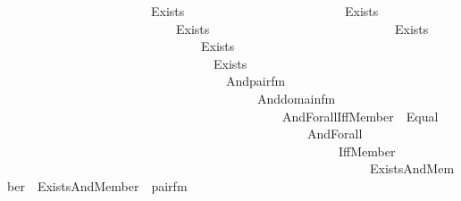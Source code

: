 \begin{isabellebody}
\ \ \ \ \ \ \ \ \ \ \ \ \ \ \ \ \ \ \ \ \ \ \ {\isacharparenleft}{\kern0pt}Exists\isanewline
\ \ \ \ \ \ \ \ \ \ \ \ \ \ \ \ \ \ \ \ \ \ \ \ \ {\isacharparenleft}{\kern0pt}Exists\isanewline
\ \ \ \ \ \ \ \ \ \ \ \ \ \ \ \ \ \ \ \ \ \ \ \ \ \ \ {\isacharparenleft}{\kern0pt}Exists\isanewline
\ \ \ \ \ \ \ \ \ \ \ \ \ \ \ \ \ \ \ \ \ \ \ \ \ \ \ \ \ {\isacharparenleft}{\kern0pt}Exists\isanewline
\ \ \ \ \ \ \ \ \ \ \ \ \ \ \ \ \ \ \ \ \ \ \ \ \ \ \ \ \ \ \ {\isacharparenleft}{\kern0pt}Exists\isanewline
\ \ \ \ \ \ \ \ \ \ \ \ \ \ \ \ \ \ \ \ \ \ \ \ \ \ \ \ \ \ \ \ \ {\isacharparenleft}{\kern0pt}Exists\isanewline
\ \ \ \ \ \ \ \ \ \ \ \ \ \ \ \ \ \ \ \ \ \ \ \ \ \ \ \ \ \ \ \ \ \ \ {\isacharparenleft}{\kern0pt}And{\isacharparenleft}{\kern0pt}pair{\isacharunderscore}{\kern0pt}fm{\isacharparenleft}{\kern0pt}{}{\isacharcomma}{\kern0pt}\ {}{\isacharcomma}{\kern0pt}\ {}{}{\isacharparenright}{\kern0pt}{\isacharcomma}{\kern0pt}\isanewline
\ \ \ \ \ \ \ \ \ \ \ \ \ \ \ \ \ \ \ \ \ \ \ \ \ \ \ \ \ \ \ \ \ \ \ \ \ \ \ \ And{\isacharparenleft}{\kern0pt}domain{\isacharunderscore}{\kern0pt}fm{\isacharparenleft}{\kern0pt}{}{\isacharcomma}{\kern0pt}\ {}{\isacharparenright}{\kern0pt}{\isacharcomma}{\kern0pt}\isanewline
\ \ \ \ \ \ \ \ \ \ \ \ \ \ \ \ \ \ \ \ \ \ \ \ \ \ \ \ \ \ \ \ \ \ \ \ \ \ \ \ \ \ \ \ And{\isacharparenleft}{\kern0pt}Forall{\isacharparenleft}{\kern0pt}Iff{\isacharparenleft}{\kern0pt}Member{\isacharparenleft}{\kern0pt}{}{\isacharcomma}{\kern0pt}\ {}{\isacharparenright}{\kern0pt}{\isacharcomma}{\kern0pt}\ Equal{\isacharparenleft}{\kern0pt}{}{\isacharcomma}{\kern0pt}\ {}{\isacharparenright}{\kern0pt}{\isacharparenright}{\kern0pt}{\isacharparenright}{\kern0pt}{\isacharcomma}{\kern0pt}\isanewline
\ \ \ \ \ \ \ \ \ \ \ \ \ \ \ \ \ \ \ \ \ \ \ \ \ \ \ \ \ \ \ \ \ \ \ \ \ \ \ \ \ \ \ \ \ \ \ \ And{\isacharparenleft}{\kern0pt}Forall\isanewline
\ \ \ \ \ \ \ \ \ \ \ \ \ \ \ \ \ \ \ \ \ \ \ \ \ \ \ \ \ \ \ \ \ \ \ \ \ \ \ \ \ \ \ \ \ \ \ \ \ \ \ \ \ {\isacharparenleft}{\kern0pt}Iff{\isacharparenleft}{\kern0pt}Member{\isacharparenleft}{\kern0pt}{}{\isacharcomma}{\kern0pt}\ {}{\isacharparenright}{\kern0pt}{\isacharcomma}{\kern0pt}\isanewline
\ \ \ \ \ \ \ \ \ \ \ \ \ \ \ \ \ \ \ \ \ \ \ \ \ \ \ \ \ \ \ \ \ \ \ \ \ \ \ \ \ \ \ \ \ \ \ \ \ \ \ \ \ \ \ \ \ \ Exists{\isacharparenleft}{\kern0pt}And{\isacharparenleft}{\kern0pt}Member{\isacharparenleft}{\kern0pt}{}{\isacharcomma}{\kern0pt}\ {}{\isacharparenright}{\kern0pt}{\isacharcomma}{\kern0pt}\ Exists{\isacharparenleft}{\kern0pt}And{\isacharparenleft}{\kern0pt}Member{\isacharparenleft}{\kern0pt}{}{\isacharcomma}{\kern0pt}\ {}{\isacharparenright}{\kern0pt}{\isacharcomma}{\kern0pt}\ pair{\isacharunderscore}{\kern0pt}fm{\isacharparenleft}{\kern0pt}{}{\isacharcomma}{\kern0pt}\ {}{\isacharcomma}{\kern0pt}\ {}{\isacharparenright}{\kern0pt}{\isacharparenright}{\kern0pt}{\isacharparenright}{\kern0pt}{\isacharparenright}{\kern0pt}{\isacharparenright}{\kern0pt}{\isacharparenright}{\kern0pt}{\isacharparenright}{\kern0pt}{\isacharcomma}{\kern0pt}\isanewline

\end{isabellebody}
